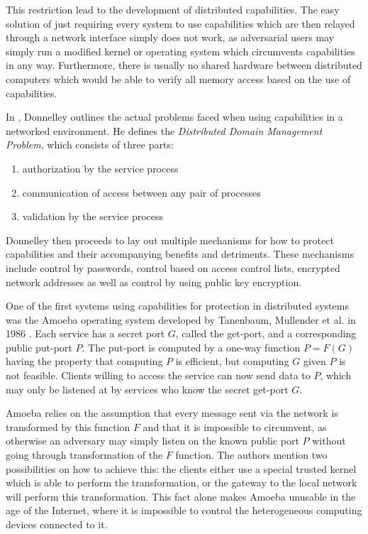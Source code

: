 This restriction lead to the development of distributed capabilities.
The easy solution of just requiring every system to use capabilities which are then relayed through a network interface simply does not work, as adversarial users may simply run a modified kernel or operating system which circumvents capabilities in any way.
Furthermore, there is usually no shared hardware between distributed computers which would be able to verify all memory access based on the use of capabilities.

In \cite{donnelley1981managing}, Donnelley outlines the actual problems faced when using capabilities in a networked environment.
He defines the \emph{Distributed Domain Management Problem}, which consists of three parts:
\begin{enumerate}
    \item authorization by the service process
    \item communication of access between any pair of processes
    \item validation by the service process
\end{enumerate}
Donnelley then proceeds to lay out multiple mechanisms for how to protect capabilities and their accompanying benefits and detriments.
These mechanisms include control by passwords, control based on access control lists, encrypted network addresses as well as control by using public key encryption.

One of the first systems using capabilities for protection in distributed systems was the Amoeba operating system developed by Tanenbaum, Mullender et al. in 1986 \cite{tanenbaum1986using,mullender1990amoeba}.
Each service has a secret port $G$, called the get-port, and a corresponding public put-port $P$.
The put-port is computed by a one-way function $P = F(G)$ having the property that computing $P$ is efficient, but computing $G$ given $P$ is not feasible.
Clients willing to access the service can now send data to $P$, which may only be listened at by services who know the secret get-port $G$.

Amoeba relies on the assumption that every message sent via the network is transformed by this function $F$ and that it is impossible to circumvent, as otherwise an adversary may simply listen on the known public port $P$ without going through transformation of the $F$ function.
The authors mention two possibilities on how to achieve this: the clients either use a special trusted kernel which is able to perform the transformation, or the gateway to the local network will perform this transformation.
This fact alone makes Amoeba unusable in the age of the Internet, where it is impossible to control the heterogeneous computing devices connected to it.

